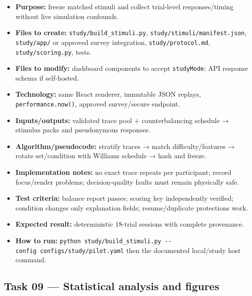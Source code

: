 \documentclass[
  english,
  11pt,
  a4paper,
]{article}
\providecommand{\tightlist}{%
  \setlength{\itemsep}{0pt}\setlength{\parskip}{0pt}}
\begin{document}
\begin{itemize}
\tightlist
\item
  \textbf{Purpose:} freeze matched stimuli and collect trial-level
  responses/timing without live simulation confounds.
\item
  \textbf{Files to create:} \texttt{study/build\_stimuli.py},
  \texttt{study/stimuli/manifest.json}, \texttt{study/app/} or approved
  survey integration, \texttt{study/protocol.md},
  \texttt{study/scoring.py}, tests.
\item
  \textbf{Files to modify:} dashboard components to accept
  \texttt{studyMode}; API response schema if self-hosted.
\item
  \textbf{Technology:} same React renderer, immutable JSON replays,
  \texttt{performance.now()}, approved survey/secure endpoint.
\item
  \textbf{Inputs/outputs:} validated trace pool + counterbalancing
  schedule → stimulus packs and pseudonymous responses.
\item
  \textbf{Algorithm/pseudocode:} stratify traces → match
  difficulty/features → rotate set/condition with Williams schedule →
  hash and freeze.
\item
  \textbf{Implementation notes:} no exact trace repeats per participant;
  record focus/render problems; decision-quality faults must remain
  physically safe.
\item
  \textbf{Test criteria:} balance report passes; scoring key
  independently verified; condition changes only explanation fields;
  resume/duplicate protections work.
\item
  \textbf{Expected result:} deterministic 18-trial sessions with
  complete provenance.
\item
  \textbf{How to run:}
  \texttt{python\ study/build\_stimuli.py\ -\/-config\ configs/study/pilot.yaml}
  then the documented local/study host command.
\end{itemize}

\subsection{Task 09 --- Statistical analysis and
figures}\label{task-09-statistical-analysis-and-figures}
\end{document}
